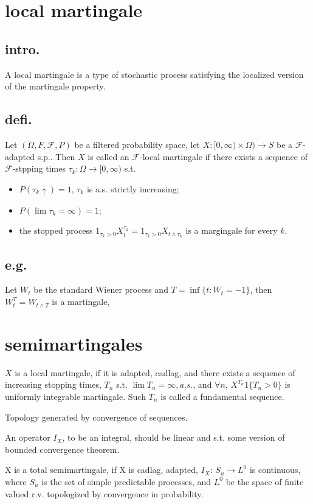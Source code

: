 
\section{local martingale}
\subsection{intro.}
A local martingale is a type of stochastic process satisfying the localized version of the martingale property.
\subsection{defi.}
Let $(\Omega,F,\mathcal{F},P)$ be a filtered probability space, let $X:[0,\infty)\times \Omega)\to S$ be a $\mathcal{F}$-adapted s.p.. Then $X$ is called an $\mathcal{F}$-local martingale if there exists a sequence of $\mathcal{F}$-stpping times $\tau_k:\Omega\to[0,\infty)$ s.t.
\begin{itemize}
  \item $P(\tau_k \uparrow)=1$, $\tau_k$ is a.s. strictly increasing;
  \item $P(\lim \tau_k=\infty)=1$;
  \item the stopped process $1_{\tau_k>0}X_t^{\tau_k}=1_{\tau_k>0}X_{t\wedge\tau_k}$ is a margingale for every $k$.
\end{itemize}
\subsection{e.g.}
Let $W_t$ be the standard Wiener process and $T=\inf\{t:W_t=-1\}$, then $ W_t^T=W_{t\wedge T} $ is a martingale,

\section{semimartingales}

$ X $ is a local martingale, if it is adapted, cadlag, and there exists a sequence of increasing stopping times, $ T_n $ s.t. $ \lim T_n=\infty, a.s. $, and $ \forall n $, $ X^{T_n} 1\{T_n>0 \} $ is uniformly integrable martingale.
Such $ T_n $ is called a fundamental sequence.

Topology generated by convergence of sequences.

An operator $ I_X $, to be an integral, should be linear and s.t. some version of bounded convergence theorem.

X is a total semimartingale, if X is cadlag, adapted, $ I_X $: $ S_u \to L^0 $ is continuous, where $ S_u $ is the set of simple predictable processes, and $ L^0 $ be the space of finite valued r.v. topologized by convergence in probability.

